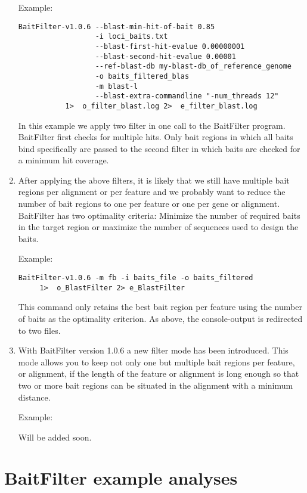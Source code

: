 \documentclass[a4paper,pdflatex,11pt]{article}
\begin{document}
\begin{enumerate}
Example:

\begin{verbatim}
BaitFilter-v1.0.6 --blast-min-hit-of-bait 0.85
                  -i loci_baits.txt
                  --blast-first-hit-evalue 0.00000001
                  --blast-second-hit-evalue 0.00001
                  --ref-blast-db my-blast-db_of_reference_genome
                  -o baits_filtered_blas
                  -m blast-l
                  --blast-extra-commandline "-num_threads 12"
           1>  o_filter_blast.log 2>  e_filter_blast.log
\end{verbatim}

In this example we apply two filter in one call to the BaitFilter program.
BaitFilter first checks for multiple hits. Only bait regions in which all baits bind specifically
are passed to the second filter in which baits
are checked for a minimum hit coverage.

\item
  After applying the above filters, it is likely that we still have multiple bait regions
  per alignment or per feature and we probably want to reduce the number of bait regions to
  one per feature or one per gene or alignment.
  BaitFilter has two optimality criteria: Minimize the number of required baits in the
  target region or maximize the number of sequences used to design the baits.

Example:
\begin{verbatim}
BaitFilter-v1.0.6 -m fb -i baits_file -o baits_filtered
     1>  o_BlastFilter 2> e_BlastFilter
\end{verbatim}

This command only retains the best bait region per feature using the
number of baits as the optimality criterion. As above, the
console-output is redirected to two files.

\item With BaitFilter version 1.0.6 a new filter mode has been introduced.
This mode allows you to keep not only one but multiple bait regions per feature, or alignment, if the
length of the feature or alignment is long enough so that two or more bait regions can be situated
in the alignment with a minimum distance.

Example:

Will be added soon.

\end{enumerate}

\section{BaitFilter example analyses}
\end{document}
